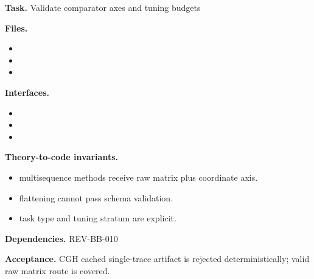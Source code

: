\begin{statusbox}[CODE-BB-009]
\textbf{Task.} Validate comparator axes and tuning budgets\par
\textbf{Files.}
\begin{itemize}[leftmargin=1.7em,itemsep=1.5pt,topsep=2pt]
\item {}
\item {}
\item {}
\end{itemize}
\textbf{Interfaces.}
\begin{itemize}[leftmargin=1.7em,itemsep=1.5pt,topsep=2pt]
\item {}
\item {}
\item {}
\end{itemize}
\textbf{Theory-to-code invariants.}
\begin{itemize}[leftmargin=1.7em,itemsep=1.5pt,topsep=2pt]
\item multisequence methods receive raw matrix plus coordinate axis.
\item flattening cannot pass schema validation.
\item task type and tuning stratum are explicit.
\end{itemize}
\textbf{Dependencies.} REV-BB-010\par
\textbf{Acceptance.} CGH cached single-trace artifact is rejected deterministically; valid raw matrix route is covered.
\end{statusbox}

